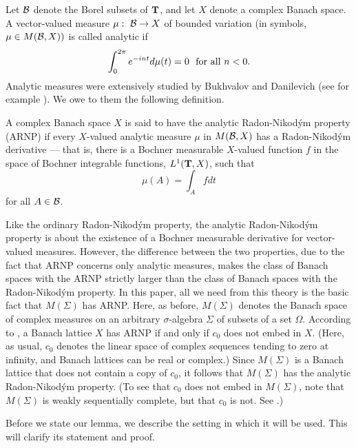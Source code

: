 Let ${\cal B}$ denote the Borel subsets of $\T$, and let $X$ denote 
a complex Banach space.  A vector-valued measure 
$\mu:\  {\cal B}\rightarrow X$ of bounded variation (in symbols, 
$\mu\in M({\cal B},X))$ is called 
analytic if 
$$\int_0^{2\pi} e^{-i n t} d\mu (t) = 0\ \ {\rm for\ all}\ n < 0.$$
Analytic measures were extensively studied by Bukhvalov 
and Danilevich (see for example \cite{bd}).  We owe to them the following
definition.
\begin{defarnp}
A complex Banach space $X$ is said to have the analytic 
Radon-Nikod\'ym property (ARNP) if every $X$-valued analytic 
measure $\mu$ in $M({\cal B},X)$ has a Radon-Nikod\'ym 
derivative ---  that is, there is a Bochner measurable $X$-valued 
function $f$ 
in the space of Bochner integrable functions, $L^1(\T,X)$, 
such that
$$\mu(A)=\int_A f dt$$
for all $A\in {\cal B}$.
\label{defarnp}
\end{defarnp}
Like the ordinary 
Radon-Nikod\'ym property, the analytic
Radon-Nikod\'ym property is
about the existence of a Bochner measurable derivative for
vector-valued measures.  However, the difference between the two 
properties, due to the fact that ARNP concerns only analytic measures,
makes the class of Banach spaces with the ARNP strictly larger 
than the class of Banach
spaces with the Radon-Nikod\'ym property.
In this paper, all we need from this theory is the
basic fact that $M(\Sigma)$ has ARNP.  Here, as before, $M(\Sigma)$
denotes the Banach space of complex measures on an arbitrary
$\sigma$-algebra $\Sigma$ of subsets of a set $\Omega$.
According to 
\cite[Theorem 1]{bd},
a Banach lattice $X$ has ARNP if and only if $c_0$ does not embed
in $X$.  (Here, as usual, $c_0$ denotes the linear space of 
complex sequences tending to zero at infinity, and Banach
lattices can be real or complex.)
Since $M(\Sigma)$ is a Banach lattice 
that does not contain a copy of $c_0$, it follows that 
$M(\Sigma)$ has the analytic Radon-Nikod\'ym property.  
(To see that $c_0$ does not embed in $M(\Sigma)$, 
note that $M(\Sigma)$ is weakly sequentially complete, but that
$c_0$ is not.  See \cite[Theorem IV.9.4]{df}.)

Before we state our lemma, we
describe the setting in which it will be used. This will
clarify its statement and proof.

